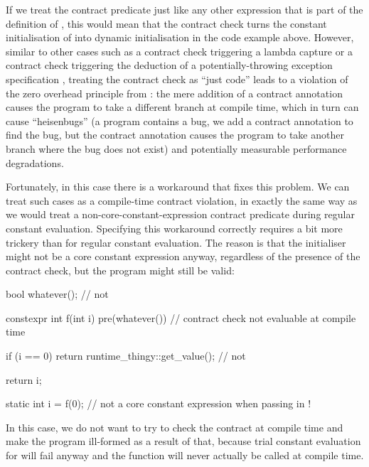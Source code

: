 If we treat the contract predicate just like any other expression that is part of the definition of , this would mean that the contract check turns the constant initialisation of  into dynamic initialisation in the code example above. However, similar to other cases such as a contract check triggering a lambda capture \cite{P2890R1} or a contract check triggering the deduction of a potentially-throwing exception specification \cite{P2969R0}, treating the contract check as ``just code'' leads to a violation of the zero overhead principle from \cite{P2932R2}: the mere addition of a contract annotation causes the program to take a different branch at compile time, which in turn can cause ``heisenbugs'' (a program contains a bug, we add a contract annotation to find the bug, but the contract annotation causes the program to take another branch where the bug does not exist) and potentially measurable performance degradations.

Fortunately, in this case there is a workaround that fixes this problem. We can treat such cases as a compile-time contract violation, in exactly the same way as we would treat a non-core-constant-expression contract predicate during regular constant evaluation. Specifying this workaround correctly requires a bit more trickery than for regular constant evaluation. The reason is that the initialiser might not be a core constant expression anyway, regardless of the presence of the contract check, but the program might still be valid:

\begin{codeblock}
bool whatever();     // not 

constexpr int f(int i)
  pre(whatever())  // contract check not evaluable at compile time
{
  if (i == 0)
    return runtime_thingy::get_value();  // not 

  return i;
}

static int i = f(0);  // not a core constant expression when passing in !
\end{codeblock}

In this case, we do not want to try to check the contract at compile time and make the program ill-formed as a result of that, because trial constant evaluation for  will fail anyway and the function will never actually be called at compile time.


